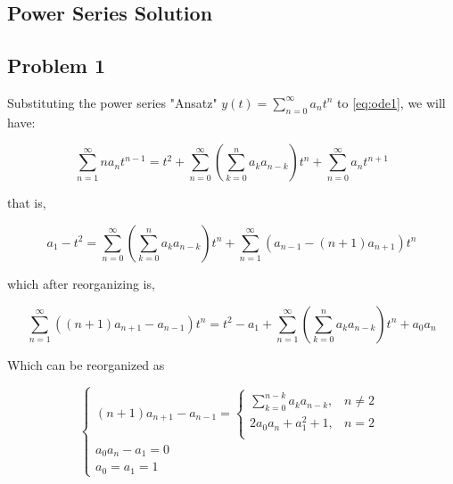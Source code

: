 \documentclass[a4paper]{article}
\begin{document}
    \begin{appendices}
    
    \section{Power Series Solution}\label{apdx:power_series}
    
    \subsection{Problem 1}
    
    Substituting the power series "Ansatz" $y(t) = \sum_{n=0}^{\infty} a_n t^n$ to \autoref{eq:ode1}, we will have:
    
    \begin{equation}
        \sum_{n=1}^{\infty} n a_n t^{n-1} = t^2 + \sum_{n = 0}^{\infty}(\sum_{k=0}^{n}a_k a_{n-k})t^n + \sum_{n=0}^{\infty}a_n t^{n+1}
    \end{equation}
    
    that is, 
    
    \begin{equation}
        a_1 - t^2 = \sum_{n=0}^{\infty}(\sum_{k=0}^{n}a_k a_{n-k})t^n + \sum_{n=1}^{\infty}(a_{n-1}-(n+1)a_{n+1})t^n
    \end{equation}
    
    which after reorganizing is, 
    
    \begin{equation}
        \sum_{n=1}^{\infty}((n+1)a_{n+1} - a_{n-1})t^n = t^2 - a_1 + \sum_{n=1}^{\infty}(\sum_{k=0}^{n}a_k a_{n-k})t^n + a_0 a_n
    \end{equation}
    
    Which can be reorganized as
    
    \begin{equation}
        \begin{cases}
            (n+1)a_{n+1}-a_{n-1} = 
                \begin{cases}
                    \sum_{k=0}^{n-k}a_k a_{n-k}, & \text{$n \neq 2$} \\
			    	2a_0a_n + a_1^2 + 1, & \text{$n = 2$} \\
                \end{cases} \\
            a_0 a_n - a_1 = 0 \\
            a_0 = a_1 = 1
        \end{cases}
    \end{equation}
    

\end{appendices}
\end{document}
